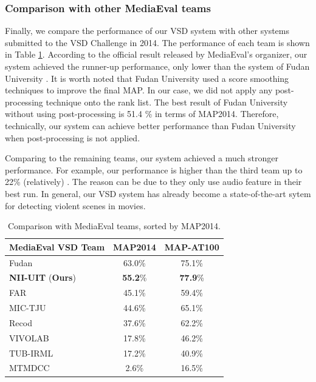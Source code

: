 \documentclass[twocolumn]{bmcart}%
\begin{document}
\subsubsection{Comparison with other MediaEval teams}

Finally, we compare the performance of our VSD system with other systems submitted to the VSD Challenge in 2014. The performance of each team is 
shown in Table \ref{tab:mediaeval}. According to the official result released by MediaEval's organizer, our system achieved the runner-up performance, only lower than the system of Fudan University \cite{2014fudan}. It is worth noted that Fudan University used a score smoothing techniques to improve the final MAP. In our case, we did not apply any post-processing technique onto the rank list. The best result of Fudan University without using post-processing is 51.4 \% in terms of MAP2014. Therefore, technically, our system can achieve better performance than Fudan University when post-processing is not applied. 

Comparing to the remaining teams, our system achieved a much stronger performance. For example, our performance is higher than the third team up to 22\% (relatively) \cite{2014far}. The reason can be due to they only use audio feature in their best run. In general, our VSD system has already become a state-of-the-art sytem for detecting violent scenes in movies.
\begin{table}
	\centering
	\caption{Comparison with MediaEval teams, sorted by MAP2014.}
	\begin{tabular}{lcc}
		\hline
		MediaEval VSD Team & MAP2014 & MAP-AT100 \\ \hline
		Fudan \cite{2014fudan} & 63.0\% & 75.1\% \\
		\textbf{NII-UIT} \cite{2014nii} (\textbf{Ours}) & \textbf{55.2}\% & \textbf{77.9}\% \\
		FAR \cite{2014far} & 45.1\% & 59.4\% \\
		MIC-TJU \cite{2014mic} & 44.6\% & 65.1\% \\
		Recod \cite{avila2014recod} & 37.6\% & 62.2\% \\
		VIVOLAB \cite{2014vivolab} & 17.8\% & 46.2\% \\
		TUB-IRML \cite{2014tub} & 17.2\% & 40.9\% \\
		MTMDCC \cite{2014mtm} & 2.6\% & 16.5\% \\ \hline
	\end{tabular}%
	\label{tab:mediaeval}%
\end{table}%
\end{document}
